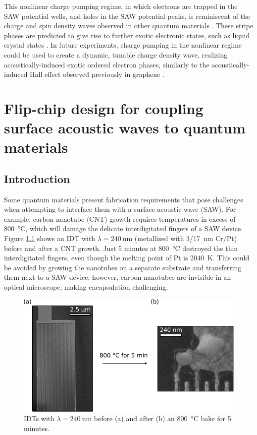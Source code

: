 \documentclass[double,12pt,1in,seploa]{beavtex}
\let\Oldsection\section
\renewcommand{\section}{\FloatBarrier\Oldsection}
\begin{document}
This nonlinear charge pumping regime, in which electrons are trapped in the SAW potential wells, and holes in the SAW potential peaks, is reminiscent of the charge and spin density waves observed in other quantum materials \cite{rahnejat_charge_2011,pasztor_multiband_2021}. These stripe phases are predicted to give rise to further exotic electronic states, such as liquid crystal states \cite{fradkin_liquid-crystal_1999}. In future experiments, charge pumping in the nonlinear regime could be used to create a dynamic, tunable charge density wave, realizing acoustically-induced exotic ordered electron phases, similarly to the acoustically-induced Hall effect observed previously in graphene \cite{zhao_acoustically_2022}. 


\chapter{Flip-chip design for coupling surface acoustic waves to quantum materials} \label{flip-chip chapter}

\section{Introduction}
Some quantum materials present fabrication requirements that pose challenges when attempting to interface them with a surface acoustic wave (SAW). For example, carbon nanotube (CNT) growth requires temperatures in excess of \SI{800}{\celsius}, which will damage the delicate interdigitated fingers of a SAW device. Figure \ref{IDT damaged} shows an IDT with $\lambda = \SI{240}{\nano\meter}$ (metallized with 3/\SI{17}{\nano\meter} Cr/Pt) before and after a CNT growth. Just 5 minutes at \SI{800}{\celsius} destroyed the thin interdigitated fingers, even though the melting point of Pt is \SI{2040}{\kelvin}. This could be avoided by growing the nanotubes on a separate substrate and transferring them next to a SAW device; however, carbon nanotubes are invisible in an optical microscope, making encapsulation challenging.

\begin{figure}
    \includegraphics{IDT damaged.pdf}
    \caption{IDTs with $\lambda = \SI{240}{\nano\meter}$ before (a) and after (b) an \SI{800}{\celsius} bake for 5 minutes.} 
    \label{IDT damaged}
\end{figure}
\end{document}
